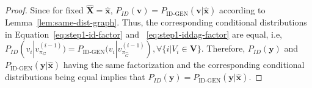 \documentclass{article}
\newcommand{\y}{\mathbf{y}}
\newcommand{\Xp}{{\hat{\mathbf{X}}}}
\newcommand{\xp}{{\hat{\mathbf{x}}}}
\newcommand{\Gp}{{\hat{{G}}}}
\newcommand{\V}{\mathbf{V}}
\newcommand{\vb}{\mathbf{v}}
\newcommand{\data}{\mathcal{D}}
\newcommand{\idgen}{\text{ID-GEN}\xspace}
\theoremstyle{plain}
\theoremstyle{definition}
\theoremstyle{remark}
\begin{document}
\begin{proof}
		
		
		Since for fixed $\Xp =\xp$, $P_{ID}(\vb)= P_{\idgen}(\vb|\xp)$ according to Lemma~\ref{lem:same-dist-graph}. Thus, the corresponding conditional distributions in Equation~\ref{eq:step1-id-factor} and ~\ref{eq:step1-iddag-factor} are equal, i.e,  $P_{ID}(v_i | v_{\pi_{G}}^{(i-1)}) = P_{\idgen}(v_i| v_{\pi_{\Gp}}^{(i-1)}), 
  \forall \{i|V_i\in \V\}$. 
		Therefore, $P_{ID}(\y)$ and $P_{\idgen}(\y|\xp)$ having the same factorization and the corresponding conditional distributions being equal implies that $P_{ID}(\y)= P_{\idgen}(\y|\xp)$.
		
		
		
		
		
		
		

\end{proof}
\end{document}
